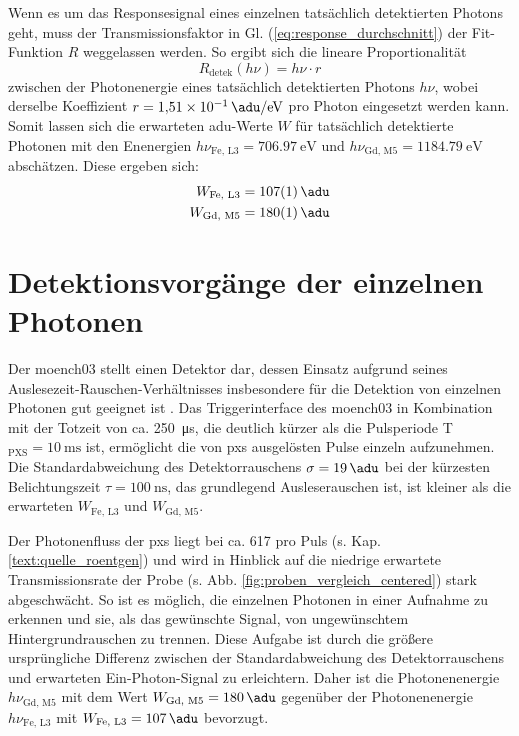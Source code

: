 \noindent
Wenn es um das Responsesignal eines einzelnen tatsächlich detektierten Photons geht, muss der Transmissionsfaktor in Gl. (\ref{eq:response_durchschnitt}) der Fit-Funktion $R$ weggelassen werden. So ergibt sich die lineare Proportionalität
\begin{equation}
    R_\text{detek}(h\nu) = h\nu \cdot r
    \label{eq:adu_to_ev}
\end{equation}
zwischen der Photonenergie eines tatsächlich detektierten Photons $h\nu$, wobei derselbe Koeffizient $r = \SI{1.51e-1}{\adu\per\eV}$ pro Photon eingesetzt werden kann. Somit lassen sich die erwarteten \gls{adu}-Werte $W$ für tatsächlich detektierte Photonen mit den Enenergien $h\nu_{\text{Fe, L3}} = \SI{706.97}{\eV}$ und $h\nu_{\text{Gd, M5}} = \SI{1184.79}{\eV}$ abschätzen. Diese ergeben sich:
\begin{equation}
\begin{split}
     W_{\text{Fe, L3}} &=  \SI{107(1)}{\adu}\\
     W_{\text{Gd, M5}} &=  \SI{180(1)}{\adu}
\end{split}
\label{eq:auselesewerte_fe_gd}
\end{equation}


\section{Detektionsvorgänge der einzelnen Photonen}
\label{text:single_photon_theorie}
Der \gls{moench03} stellt einen Detektor dar, dessen Einsatz aufgrund seines Auslesezeit-Rauschen-Ver\-hält\-nis\-ses insbesondere für die Detektion von einzelnen Photonen gut geeignet ist \cite{bergamaschi_monch_2018}. Das Triggerinterface des \gls{moench03} in Kombination mit der Totzeit von ca. \SI{250}{\micro\second}, die deutlich kürzer als die Pulsperiode T$_\text{PXS} = \SI{10}{\milli\second}$ ist, ermöglicht die von \gls{pxs} ausgelösten Pulse einzeln aufzunehmen. Die Standardabweichung des Detektorrauschens $\sigma = \SI{19}{\adu}$ bei der kürzesten Belichtungszeit $\tau = \SI{100}{\nano\second}$, das grundlegend Ausleserauschen ist, ist kleiner als die erwarteten $W_{\text{Fe, L3}}$ und $W_{\text{Gd, M5}}$.

\noindent
Der Photonenfluss der \gls{pxs} liegt bei ca. \SI{617}{\photons} pro Puls (s. Kap. \ref{text:quelle_roentgen}) und wird in Hinblick auf die niedrige erwartete Transmissionsrate der Probe (s. Abb. \ref{fig:proben_vergleich_centered}) stark abgeschwächt. So ist es möglich, die einzelnen Photonen in einer Aufnahme zu erkennen und sie, als das gewünschte Signal, von ungewünschtem Hintergrundrauschen zu trennen. Diese Aufgabe ist durch die größere ursprüngliche Differenz zwischen der Standardabweichung des Detektorrauschens und erwarteten Ein-Photon-Signal zu erleichtern. Daher ist die Photonenenergie $h\nu_\text{Gd, M5}$ mit dem Wert $W_{\text{Gd, M5}} = \SI{180}{\adu}$ gegenüber der Photonenenergie $h\nu_\text{Fe, L3}$ mit $W_{\text{Fe, L3}} = \SI{107}{\adu}$ bevorzugt.

